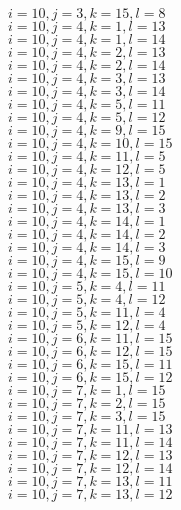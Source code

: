 \documentclass[14pt]{article}
\begin{document}
    $i=10,j=3,k=15,l=8 $ \\ 
    $i=10,j=4,k=1,l=13 $ \\ 
    $i=10,j=4,k=1,l=14 $ \\ 
    $i=10,j=4,k=2,l=13 $ \\ 
    $i=10,j=4,k=2,l=14 $ \\ 
    $i=10,j=4,k=3,l=13 $ \\ 
    $i=10,j=4,k=3,l=14 $ \\ 
    $i=10,j=4,k=5,l=11 $ \\ 
    $i=10,j=4,k=5,l=12 $ \\ 
    $i=10,j=4,k=9,l=15 $ \\ 
    $i=10,j=4,k=10,l=15 $ \\ 
    $i=10,j=4,k=11,l=5 $ \\ 
    $i=10,j=4,k=12,l=5 $ \\ 
    $i=10,j=4,k=13,l=1 $ \\ 
    $i=10,j=4,k=13,l=2 $ \\ 
    $i=10,j=4,k=13,l=3 $ \\ 
    $i=10,j=4,k=14,l=1 $ \\ 
    $i=10,j=4,k=14,l=2 $ \\ 
    $i=10,j=4,k=14,l=3 $ \\ 
    $i=10,j=4,k=15,l=9 $ \\ 
    $i=10,j=4,k=15,l=10 $ \\ 
    $i=10,j=5,k=4,l=11 $ \\ 
    $i=10,j=5,k=4,l=12 $ \\ 
    $i=10,j=5,k=11,l=4 $ \\ 
    $i=10,j=5,k=12,l=4 $ \\ 
    $i=10,j=6,k=11,l=15 $ \\ 
    $i=10,j=6,k=12,l=15 $ \\ 
    $i=10,j=6,k=15,l=11 $ \\ 
    $i=10,j=6,k=15,l=12 $ \\ 
    $i=10,j=7,k=1,l=15 $ \\ 
    $i=10,j=7,k=2,l=15 $ \\ 
    $i=10,j=7,k=3,l=15 $ \\ 
    $i=10,j=7,k=11,l=13 $ \\ 
    $i=10,j=7,k=11,l=14 $ \\ 
    $i=10,j=7,k=12,l=13 $ \\ 
    $i=10,j=7,k=12,l=14 $ \\ 
    $i=10,j=7,k=13,l=11 $ \\ 
    $i=10,j=7,k=13,l=12 $ \\ 
\end{document}
